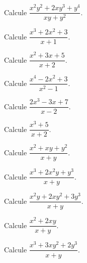 \begin{ejercicio}
Calcule $\dfrac{x^2y^2+2xy^3+y^4}{xy+y^2}$.
\end{ejercicio}


\begin{ejercicio}
Calcule $\dfrac{x^3+2x^2+3}{x+1}$.
\end{ejercicio}

\begin{ejercicio}
Calcule $\dfrac{x^2+3x+5}{x+2}$.
\end{ejercicio}

\begin{ejercicio}
Calcule $\dfrac{x^4-2x^2+3}{x^2-1}$.
\end{ejercicio}

\begin{ejercicio}
Calcule $\dfrac{2x^3-3x+7}{x-2}$.
\end{ejercicio}

\begin{ejercicio}
Calcule $\dfrac{x^3+5}{x+2}$.
\end{ejercicio}


\begin{ejercicio}
Calcule $\dfrac{x^2+xy+y^2}{x+y}$.
\end{ejercicio}

\begin{ejercicio}
Calcule $\dfrac{x^3+2x^2y+y^3}{x+y}$.
\end{ejercicio}

\begin{ejercicio}
Calcule $\dfrac{x^2y+2xy^2+3y^3}{x+y}$.
\end{ejercicio}

\begin{ejercicio}
Calcule $\dfrac{x^2+2xy}{x+y}$.
\end{ejercicio}

\begin{ejercicio}
Calcule $\dfrac{x^3+3xy^2+2y^3}{x+y}$.
\end{ejercicio}

